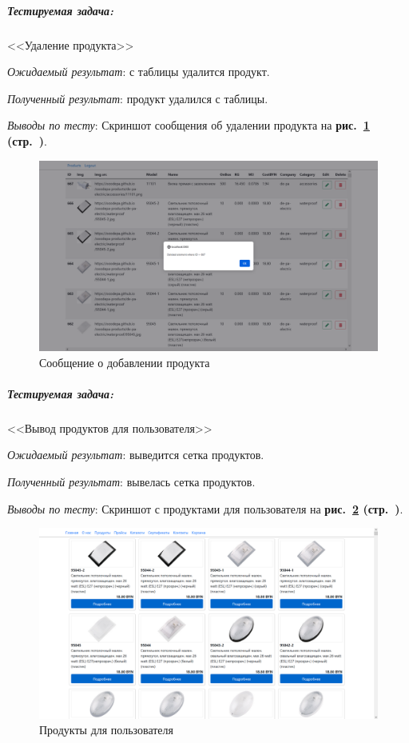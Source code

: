 
\subparagraph{Тестируемая задача:} <<Удаление продукта>>

\textit{Ожидаемый результат}: с таблицы удалится продукт.

\textit{Полученный результат}: продукт удалился с таблицы.

\textit{Выводы по тесту}: 
Скриншот сообщения об удалении продукта на
\textbf{рис.~\ref{fig:gpi_pz_delete_product} (стр.~\pageref{fig:gpi_pz_delete_product})}.

\begin{figure}[!htb]
    \centering
    \includegraphics[width=12cm]
        {_assets/gpi_pz_delete_product.png}
    \caption{Сообщение о добавлении продукта}
    \label{fig:gpi_pz_delete_product}
\end{figure}


\subparagraph{Тестируемая задача:} <<Вывод продуктов для пользователя>>

\textit{Ожидаемый результат}: выведится сетка продуктов.

\textit{Полученный результат}: вывелась сетка продуктов.

\textit{Выводы по тесту}: 
Скриншот с продуктами для пользователя на
\textbf{рис.~\ref{fig:gpi_pz_user_products} (стр.~\pageref{fig:gpi_pz_user_products})}.

\begin{figure}[!htb]
    \centering
    \includegraphics[width=16cm]
        {_assets/gpi_pz_user_products.png}
    \caption{Продукты для пользователя}
    \label{fig:gpi_pz_user_products}
\end{figure}

